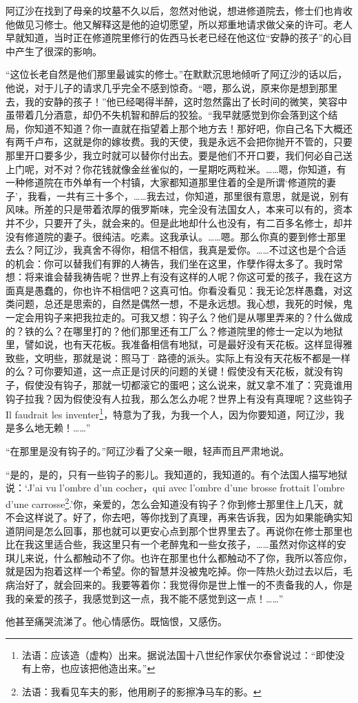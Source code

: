 \par 阿辽沙在找到了母亲的坟墓不久以后，忽然对他说，想进修道院去，修士们也肯收他做见习修士。他又解释这是他的迫切愿望，所以郑重地请求做父亲的许可。老人早就知道，当时正在修道院里修行的佐西马长老已经在他这位“安静的孩子”的心目中产生了很深的影响。
\par “这位长老自然是他们那里最诚实的修士。”在默默沉思地倾听了阿辽沙的话以后，他说，对于儿子的请求几乎完全不感到惊奇。“嗯，那么说，原来你是想到那里去，我的安静的孩子！”他已经喝得半醉，这时忽然露出了长时间的微笑，笑容中虽带着几分酒意，却仍不失机智和醉后的狡狯。“我早就感觉到你会落到这个结局，你知道不知道？你一直就在指望着上那个地方去！那好吧，你自己名下大概还有两千卢布，这就是你的嫁妆费。我的天使，我是永远不会把你抛开不管的，只要那里开口要多少，我立时就可以替你付出去。要是他们不开口要，我们何必自己送上门呢，对不对？你花钱就像金丝雀似的，一星期吃两粒米。……嗯，你知道，有一种修道院在市外单有一个村镇，大家都知道那里住着的全是所谓‘修道院的妻子’，我看，一共有三十多个，……我去过，你知道，那里很有意思，就是说，别有风味。所差的只是带着浓厚的俄罗斯味，完全没有法国女人，本来可以有的，资本并不少，只要开了头，就会来的。但是此地却什么也没有，有二百多名修士，却并没有修道院的妻子。很纯洁。吃素。这我承认。……嗯。那么你真的要到修士那里去么？阿辽沙，我真舍不得你，相信不相信，我真是爱你。……不过这也是个合适的机会：你可以替我们有罪的人祷告，我们坐在这里，作孽作得太多了。我时常想：将来谁会替我祷告呢？世界上有没有这样的人呢？你这可爱的孩子，我在这方面真是愚蠢的，你也许不相信吧？这真可怕。你看没看见：我无论怎样愚蠢，对这类问题，总还是思索的，自然是偶然一想，不是永远想。我心想，我死的时候，鬼一定会用钩子来把我拉走的。可我又想：钩子么？他们是从哪里弄来的？什么做成的？铁的么？在哪里打的？他们那里还有工厂么？修道院里的修士一定以为地狱里，譬如说，也有天花板。我准备相信有地狱，可是最好没有天花板。这样显得雅致些，文明些，那就是说：照马丁·路德的派头。实际上有没有天花板不都是一样的么？可你要知道，这一点正是讨厌的问题的关键！假使没有天花板，就没有钩子，假使没有钩子，那就一切都滚它的蛋吧；这么说来，就又拿不准了：究竟谁用钩子拉我？因为假使没有人拉我，那么怎么办呢？世界上有没有真理呢？这些钩子Il faudrait les inventer\footnote{法语：应该造（虚构）出来。据说法国十八世纪作家伏尔泰曾说过：“即使没有上帝，也应该把他造出来。”}，特意为了我，为我一个人，因为你要知道，阿辽沙，我是多么地无赖！……”
\par “在那里是没有钩子的。”阿辽沙看了父亲一眼，轻声而且严肃地说。
\par “是的，是的，只有一些钩子的影儿。我知道的，我知道的。有个法国人描写地狱说：‘J’ai vu l’ombre d’un cocher，qui avec l’ombre d’une brosse frottait l’ombre d’une carrosse\footnote{法语：我看见车夫的影，他用刷子的影擦净马车的影。}.’你，亲爱的，怎么会知道没有钩子？你到修士那里住上几天，就不会这样说了。好了，你去吧，等你找到了真理，再来告诉我，因为如果能确实知道阴间是怎么回事，那也就可以更安心点到那个世界里去了。再说你在修士那里也比在我这里适合些，我这里只有一个老醉鬼和一些女孩子，……虽然对你这样的安琪儿来说，什么都触动不了你。也许在那里也什么都触动不了你，我所以答应你，就是因为抱着这样一个希望。你的智慧并没被鬼吃掉。你一阵热火劲过去以后，毛病治好了，就会回来的。我要等着你：我觉得你是世上惟一的不责备我的人，你是我的亲爱的孩子，我感觉到这一点，我不能不感觉到这一点！……”
\par 他甚至痛哭流涕了。他心情感伤。既恼恨，又感伤。
